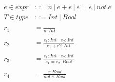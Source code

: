 \documentclass{article}
\theoremstyle{definition}
\begin{document}
\begin{mdframed}
    \begin{align*}
        e \in expr &::= n \ | \ e+e \ | \ e=e \ | \ not \ e \\
        T \in type &::= Int \ | \ Bool\\\\
        r_1 &= \frac{}{n:Int} \\\\
        r_2 &= \frac{e_1:Int \ \ \ \ e_2:Int}{e_1+e2:Int} \\\\
        r_3 &= \frac{e_1:Int \ \ \ \ e_2:Int}{e_1=e_2:Bool} \\\\
        r_4 &= \frac{e:Bool}{not \ e:Bool}
    \end{align*}
\end{mdframed}
\end{document}
